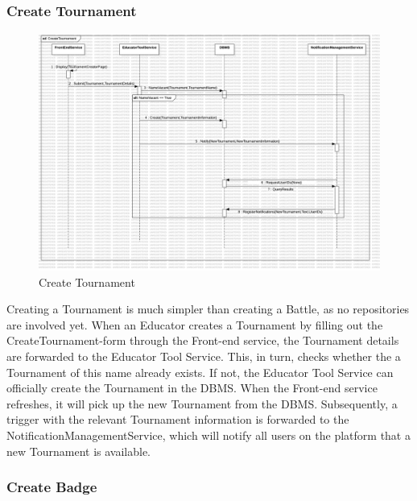 \subsubsection{Create Tournament}

\begin{figure}[H]
    \centering
    \includegraphics[width=\textwidth]{Graphics/Sequence Diagrams/CreateTournament.png}
    \caption{Create Tournament}
    \label{fig:createtournament}
\end{figure}
Creating a Tournament is much simpler than creating a Battle, as no repositories are involved yet. When an Educator creates a Tournament by filling out the CreateTournament-form through the Front-end service, the Tournament details are forwarded to the Educator Tool Service. This, in turn, checks whether the a Tournament of this name already exists. If not, the Educator Tool Service can officially create the Tournament in the DBMS. When the Front-end service refreshes, it will pick up the new Tournament from the DBMS.
Subsequently, a trigger with the relevant Tournament information is forwarded to the NotificationManagementService, which will notify all users on the platform that a new Tournament is available. 

\subsubsection{Create Badge}

